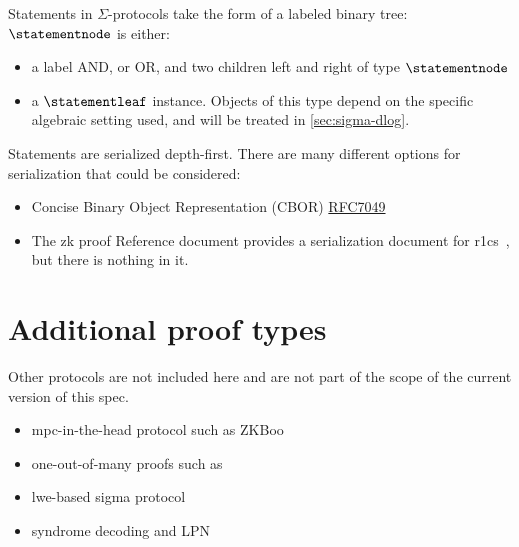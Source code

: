 \documentclass[11pt]{article}
\begin{document}
Statements in $\Sigma$-protocols take the form of a labeled binary tree:
$\statementnode$ is either:
\begin{itemize}
  \item a label \textsf{AND}, or \textsf{OR}, and two children \textsf{left} and \textsf{right} of type $\statementnode$
  \item a $\statementleaf$ instance. Objects of this type depend on the specific algebraic setting used, and will be treated in \cref{sec:sigma-dlog}.
\end{itemize}
Statements are serialized depth-first.
  There are many different options for serialization that could be considered:
  \begin{itemize}
  \item Concise Binary Object Representation (CBOR) \href{https://datatracker.ietf.org/doc/html/rfc7049}{RFC7049}
    \item The zk proof Reference document provides a serialization document for r1cs~\cite[3.4.2]{zkproof-reference}, but there is nothing in it.
\end{itemize}

\section{Additional proof types}

Other protocols are not included here and are not part of the scope of the current version of this spec.
\begin{itemize}
\item mpc-in-the-head protocol such as ZKBoo~\cite{USENIX:GiaMadOrl16}
\item one-out-of-many proofs such as~\cite{EC:GroKoh15}
\item lwe-based sigma protocol~\cite{C:AttCraKoh21}
\item syndrome decoding and LPN~\cite{C:Stern93,AC:JKPT12}
\end{itemize}



\end{document}
